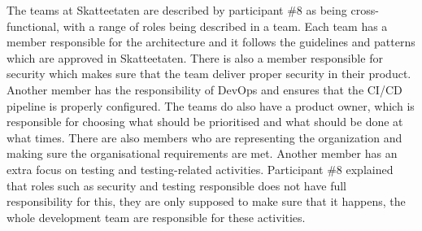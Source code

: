 
The teams at Skatteetaten are described by participant \#8 as being cross-functional, with a range of roles being described in a team. Each team has a member responsible for the architecture and it follows the guidelines and patterns which are approved in Skatteetaten. There is also a member responsible for security which makes sure that the team deliver proper security in their product. Another member has the responsibility of DevOps and ensures that the CI/CD pipeline is properly configured. The teams do also have a product owner, which is responsible for choosing what should be prioritised and what should be done at what times. There are also members who are representing the organization and making sure the organisational requirements are met. Another member has an extra focus on testing and testing-related activities. Participant \#8 explained that roles such as security and testing responsible does not have full responsibility for this, they are only supposed to make sure that it happens, the whole development team are responsible for these activities.


